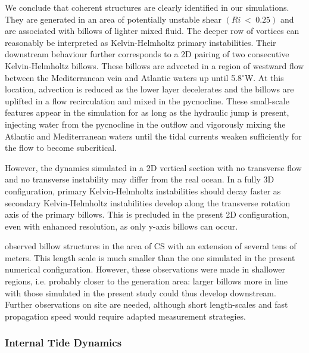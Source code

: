 We conclude that coherent structures are clearly identified in our simulations. They are generated in an area of potentially unstable shear $(Ri\ <\ 0.25)$ and are associated with billows of lighter mixed fluid. The deeper row of vortices can reasonably be interpreted as Kelvin-Helmholtz primary instabilities. Their downstream behaviour further corresponds to a 2D pairing of two consecutive Kelvin-Helmholtz billows. These billows are advected in a region of westward flow between the Mediterranean vein and  Atlantic waters up until 5.8$^\circ$W. At this location, advection is reduced as the lower layer decelerates and the billows are uplifted in a flow recirculation and mixed in the pycnocline.
These small-scale features appear in the simulation for as long as the hydraulic jump is present, injecting water from the pycnocline in the outflow and vigorously mixing the Atlantic and Mediterranean waters until the tidal currents weaken sufficiently for the flow to become subcritical. 

 However, the dynamics simulated in a 2D vertical section with no transverse flow and no transverse instability may differ from the real ocean. In a fully 3D configuration, primary Kelvin-Helmholtz instabilities should decay faster as secondary Kelvin-Helmholtz instabilities develop along the transverse rotation axis of the primary billows. This is precluded in the present 2D configuration, even with enhanced resolution, as only y-axis billows can occur.

\citet{Wesson94} observed billow structures in the area of CS with an extension of several tens of meters. This length scale is much smaller than the one simulated in the present numerical configuration. However, these observations were made in shallower regions, i.e. probably closer to the generation area: larger billows more in line with those simulated in the present study could thus develop downstream. Further observations on site are needed, although short length-scales and fast propagation speed would require adapted measurement strategies.

\subsubsection{Internal Tide Dynamics}
\label{sisw}

